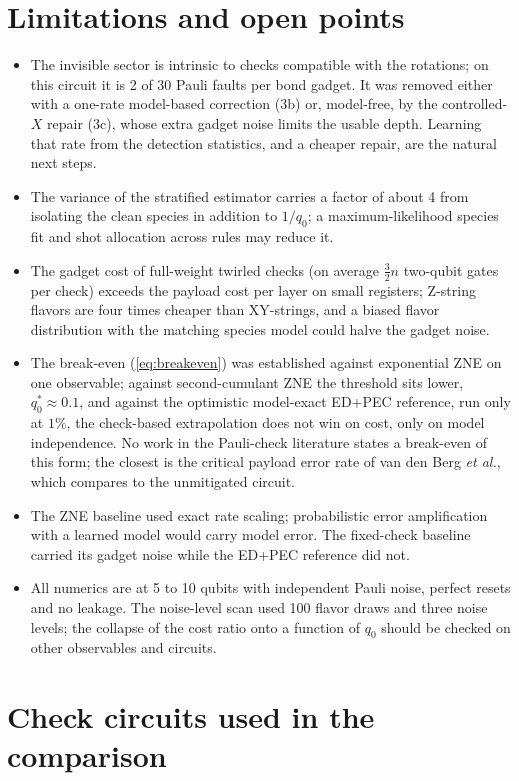 \documentclass[11pt,a4paper]{article}
\theoremstyle{remark}
\begin{document}
\section{Limitations and open points}

\begin{itemize}
\item The invisible sector is intrinsic to checks compatible with the rotations; on this circuit it is 2 of 30 Pauli faults per bond gadget. It was removed either with a one-rate model-based correction (3b) or, model-free, by the controlled-$X$ repair (3c), whose extra gadget noise limits the usable depth. Learning that rate from the detection statistics, and a cheaper repair, are the natural next steps.
\item The variance of the stratified estimator carries a factor of about 4 from isolating the clean species in addition to $1/q_0$; a maximum-likelihood species fit and shot allocation across rules may reduce it.
\item The gadget cost of full-weight twirled checks (on average $\tfrac32n$ two-qubit gates per check) exceeds the payload cost per layer on small registers; Z-string flavors are four times cheaper than XY-strings, and a biased flavor distribution with the matching species model could halve the gadget noise.
\item The break-even (\ref{eq:breakeven}) was established against exponential ZNE on one observable; against second-cumulant ZNE the threshold sits lower, $q_0^\ast\approx0.1$, and against the optimistic model-exact ED+PEC reference, run only at $1\%$, the check-based extrapolation does not win on cost, only on model independence. No work in the Pauli-check literature states a break-even of this form; the closest is the critical payload error rate of van den Berg \emph{et al.}, which compares to the unmitigated circuit.
\item The ZNE baseline used exact rate scaling; probabilistic error amplification with a learned model would carry model error. The fixed-check baseline carried its gadget noise while the ED+PEC reference did not.
\item All numerics are at 5 to 10 qubits with independent Pauli noise, perfect resets and no leakage. The noise-level scan used 100 flavor draws and three noise levels; the collapse of the cost ratio onto a function of $q_0$ should be checked on other observables and circuits.
\end{itemize}

\appendix
\section{Check circuits used in the comparison}
\label{app:circuits}
\end{document}
